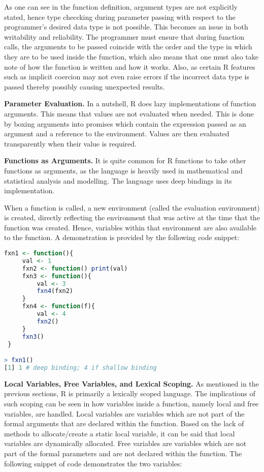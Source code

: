 \documentclass[12pt]{article}
\begin{document}
As one can see in the function definition, argument types are not explicitly stated, hence type checcking during parameter passing with respect to the programmer's desired data type is not possible. This becomes an issue in both writability and reliability. The programmer must ensure that during function calls, the arguments to be passed coincide with the order and the type in which they are to be used inside the function, which also means that one must also take note of how the function is written and how it works. Also, as certain R features such as implicit coercion may not even raise errors if the incorrect data type is passed thereby possibly causing unexpected results.

\textbf{Parameter Evaluation.} In a nutshell, R does lazy implementations of function arguments. This means that values are not evaluated when needed. This is done by boxing arguments into promises which contain the expression passed as an argument and a reference to the environment. Values are then evaluated transparently when their value is required.

\textbf{Functions as Arguments.} It is quite common for R functions to take other functions as arguments, as the language is heavily used in mathematical and statistical analysis and modelling. The language uses deep bindings in its implementation.

When a function is called, a new environment (called the evaluation environment) is created, directly reflecting  the environment that was active at the time that the function was created. Hence, variables within that environment are also available to the function. A demonstration is provided by the following code snippet:

\begin{lstlisting}[language=R ]
 fxn1 <- function(){
     val <- 1
     fxn2 <- function() print(val)
     fxn3 <- function(){
         val <- 3
         fxn4(fxn2)
     }
     fxn4 <- function(f){
         val <- 4
         fxn2()
     }
     fxn3()
 }

> fxn1()
[1] 1 # deep binding; 4 if shallow binding
\end{lstlisting}

\label{scoping_more}\textbf{Local Variables, Free Variables, and Lexical Scoping.} As mentioned in the previous sections, R is primarily a lexically scoped language. The implications of such scoping can be seen in how variables inside a function, namely local and free variables, are handled. Local variables are variables which are not part of the formal arguments that are declared within the function. Based on the lack of methods to allocate/create a static local variable, it can be said that local variables are dynamically allocated. Free variables are variables which are not part of the formal parameters and are not declared within the function. The following snippet of code demonstrates the two variables:
\end{document}
